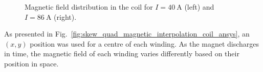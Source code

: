 \begin{figure}[H]
    \centering
    \caption{Magnetic field distribution in the coil for $I=40~\text{A}$ (left) and $I=86~\text{A}$ (right).}
    \label{fig:skew_quad_magnetic_results_coil_ansys}
\end{figure}

As presented in Fig.~\ref{fig:skew_quad_magnetic_interpolation_coil_ansys}, an $(x,y)$ position was used for a centre of each winding. As the magnet discharges in time, the magnetic field of each winding varies differently based on their position in space.


